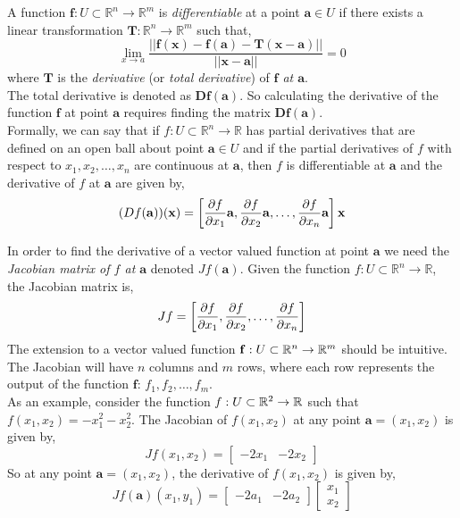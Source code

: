 \documentclass[12pt]{article}
\begin{document}
 A function $\mathbf{f}:U\subset \mathbb{R}^n\rightarrow\mathbb{R}^m$ is \emph{differentiable} at a point $\mathbf{a}\in U$ if there exists a linear transformation $\mathbf{T}:\mathbb{R}^n\rightarrow\mathbb{R}^m$ such that,
\[
\lim_{x\rightarrow a}\frac{|| \mathbf{f(x)}-\mathbf{f(a)}-\mathbf{T(x-a)} ||}{|| \mathbf{x-a} ||}=0
\]
where $\mathbf{T}$ is the \emph{derivative} (or \emph{total derivative}) of \emph{$\mathbf{f}$ at $\mathbf{a}$}.\\

 The total derivative is denoted as $\mathbf{Df(a)}$. So calculating the derivative of the function $\mathbf{f}$ at point $\mathbf{a}$ requires finding the matrix $\mathbf{Df(a)}$. \\

 Formally, we can say that if $f:U\subset\mathbb{R}^n\rightarrow\mathbb{R}$ has partial derivatives that are defined on an open ball about point $\mathbf{a}\in U$ and if the partial derivatives of $f$ with respect to $x_1,x_2,\ldots,x_n$ are continuous at $\mathbf{a}$, then $f$ is differentiable at $\mathbf{a}$ and the derivative of $f$ at $\mathbf{a}$ are given by,
\[
(Df(\mathbf{a}))(\mathbf{x}) = \left[ \frac{\partial f}{\partial x_1}\mathbf{a},\frac{\partial f}{\partial x_2}\mathbf{a},\ldots, \frac{\partial f}{\partial x_n}\mathbf{a} \right]\mathbf{x}
\] 

 In order to find the derivative of a vector valued function at point $\mathbf{a}$ we need the \emph{Jacobian matrix of $f$ at $\mathbf{a}$} denoted $Jf(\mathbf{a})$. Given the function $f:U\subset\mathbb{R}^n\rightarrow\mathbb{R}$, the Jacobian matrix is,
\[
Jf = \left[ \frac{\partial f}{\partial x_1},\frac{\partial f}{\partial x_2},\ldots,\frac{\partial f}{\partial x_n} \right]
\]
The extension to a vector valued function $\mathbf{f}:U\subset\mathbb{R}^n\rightarrow\mathbb{R}^m$ should be intuitive. The Jacobian will have $n$ columns and $m$ rows, where each row represents the output of the function $\mathbf{f}$: $f_1,f_2,\ldots,f_m$. \\

 As an example, consider the function $f:U\subset\mathbb{R}^2\rightarrow\mathbb{R}$ such that $f(x_1,x_2) = -x_1^2-x_2^2$. The Jacobian of $f(x_1,x_2)$ at any point $\mathbf{a}=(x_1,x_2)$ is given by,
\[
Jf(x_1,x_2) =
\begin{bmatrix}
-2x_1 & -2x_2
\end{bmatrix}
\]
So at any point $\mathbf{a} = (x_1,x_2)$, the derivative of $f(x_1,x_2)$ is given by,
\[
Jf(\mathbf{a})(x_1,y_1) =
\begin{bmatrix}
-2a_1 & -2a_2
\end{bmatrix}
\begin{bmatrix}
x_1 \\
x_2
\end{bmatrix}
\] \\
\end{document}
